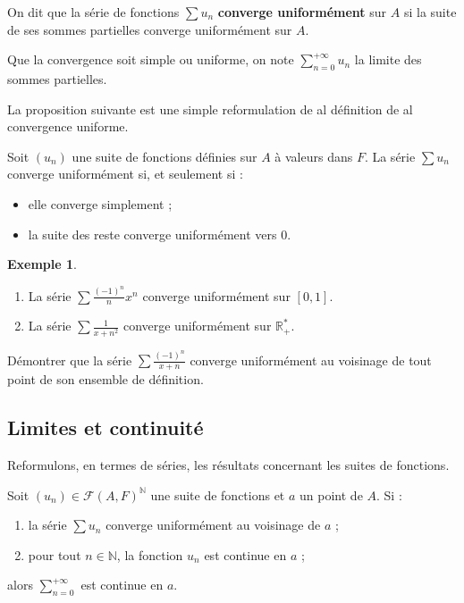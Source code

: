 \documentclass[french]{article}
\newcommand{\N}{\mathbb{N}}
\newcommand{\R}{\mathbb{R}}
\newcommand{\st}{^*}
\theoremstyle{plain}
\theoremstyle{definition}
\newtheorem*{ex}{Exemple}
\theoremstyle{remark}
\begin{document}
\begin{dfn}
	On dit que la série de fonctions $\displaystyle\sum u_n$ \textbf{converge uniformément} sur $A$ si la suite de ses sommes partielles converge uniformément sur $A$.
\end{dfn}

Que la convergence soit simple ou uniforme, on note $\displaystyle\sum_{n=0}^{+\infty}u_n$ la limite des sommes partielles.

La proposition suivante est une simple reformulation de al définition de al convergence uniforme.

\begin{prop}%
	Soit $(u_n)$ une suite de fonctions définies sur $A$ à valeurs dans $F$. La série $\displaystyle\sum u_n$ converge uniformément si, et seulement si :
	\begin{itemize}
		\item elle converge simplement ;
		\item la suite des reste converge uniformément vers $0$.
	\end{itemize}
\end{prop}

\begin{ex}
	\begin{enumerate}
		\item La série $\displaystyle\sum\frac{(-1)^n}{n}x^n$ converge uniformément sur $[0,1]$.
		\item La série $\displaystyle\sum\frac{1}{x+n^2}$ converge uniformément sur $\R_+\st$.
	\end{enumerate}
\end{ex}

\begin{exo}
	Démontrer que la série $\displaystyle\sum\frac{(-1)^n}{x+n}$ converge uniformément au voisinage de tout point de son ensemble de définition.
\end{exo}

\subsection{Limites et continuité}

Reformulons, en termes de séries, les résultats concernant les suites de fonctions.

\begin{thm}%
	Soit $(u_n)\in\mathcal{F}(A,F)^\N$ une suite de fonctions et $a$ un point de $A$. Si :
	\begin{enumerate}
		\item la série $\displaystyle\sum u_n$ converge uniformément au voisinage de $a$ ;
		\item pour tout $n\in\N$, la fonction $u_n$ est continue en $a$ ;
	\end{enumerate}
	alors $\displaystyle\sum_{n=0}^{+\infty}$ est continue en $a$.
\end{thm}
\end{document}
